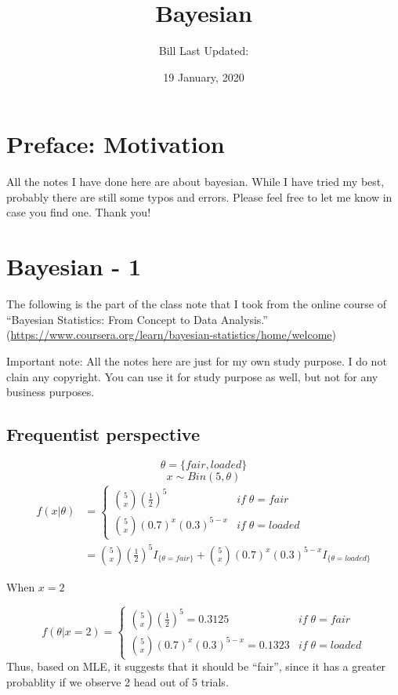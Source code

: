 \documentclass[]{book}
\title{Bayesian}
\author{Bill Last Updated:}
\date{19 January, 2020}
\begin{document}
\maketitle

{
\setcounter{tocdepth}{1}
\tableofcontents
}
\chapter*{Preface: Motivation}\label{my-section}

All the notes I have done here are about bayesian. While I have tried my
best, probably there are still some typos and errors. Please feel free
to let me know in case you find one. Thank you!

\chapter{Bayesian - 1}\label{bayesian---1}

The following is the part of the class note that I took from the online
course of ``Bayesian Statistics: From Concept to Data Analysis.''
(\url{https://www.coursera.org/learn/bayesian-statistics/home/welcome})

Important note: All the notes here are just for my own study purpose. I
do not clain any copyright. You can use it for study purpose as well,
but not for any business purposes.

\section{Frequentist perspective}\label{frequentist-perspective}

\[\theta = \{ fair , loaded \}\] \[x \sim Bin (5, \theta)\]
\[\begin{aligned} f(x|\theta) &=\begin{cases} \binom{5}{x} (\frac{1}{2})^5 & if \; \theta=fair  \\ \binom{5}{x} (0.7)^x(0.3)^{5-x} & if \;  \theta=loaded  \end{cases} \\ &= \binom{5}{x} (\frac{1}{2})^5 I_{\{\theta=fair \}}+\binom{5}{x} (0.7)^x(0.3)^{5-x}I_{\{\theta=loaded \}}\end{aligned}\]

When \(x=2\)

\[f(\theta | x=2)=\begin{cases} \binom{5}{x} (\frac{1}{2})^5 = 0.3125& if \; \theta=fair  \\ \binom{5}{x} (0.7)^x(0.3)^{5-x} = 0.1323& if \;  \theta=loaded  \end{cases}\]
Thus, based on MLE, it suggests that it should be ``fair'', since it has
a greater probablity if we observe 2 head out of 5 trials.
\end{document}
